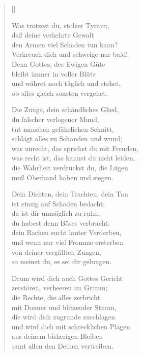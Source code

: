 \begin{multicols}{2}
\settowidth{\versewidth}{Dein Dichten, dein Trachten, dein Tun}
\begin{verse}[\versewidth]

 Was trotzest du, stolzer Tyrann,\\
daß deine verkehrte Gewalt\\
den Armen viel Schaden tun kann?\\
Verkreuch dich und schweige nur bald!\\
Denn Gottes, des Ewigen Güte\\
bleibt immer in voller Blüte\\
und währet noch täglich und stehet,\\
ob alles gleich sonsten vergehet.

 Die Zunge, dein schändliches Glied,\\
du falscher verlogener Mund,\\
tut manchen gefährlichen Schnitt,\\
schlägt alles zu Schanden und wund;\\
was unrecht, das sprichst du mit Freuden,\\
was recht ist, das kannst du nicht leiden,\\
die Wahrheit verdrückst du, die Lügen\\
muß Oberhand haben und siegen.

 Dein Dichten, dein Trachten, dein Tun\\
ist einzig auf Schaden bedacht;\\
da ist dir unmöglich zu ruhn,\\
du habest denn Böses verbracht;\\
dein Rachen sucht lauter Verderben,\\
und wenn nur viel Fromme ersterben\\
von deiner vergällten Zungen,\\
so meinst du, es sei dir gelungen.

 Drum wird dich auch Gottes Gericht\\
zerstören, verheeren im Grimm;\\
die Rechte, die alles zerbricht\\
mit Donner und blitzender Stimm,\\
die wird dich zugrunde zuschlagen\\
und wird dich mit schrecklichen Plagen\\
aus deinem bisherigen Bleiben\\
samt allen den Deinen vertreiben.


\end{verse}
\end{multicols}
